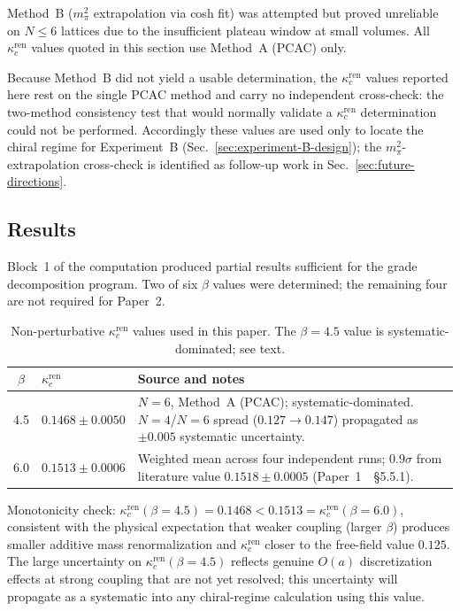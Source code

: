 \documentclass[12pt]{article}
\theoremstyle{definition}
\theoremstyle{remark}
\newcommand{\kcren}{\kappa_{c}^{\mathrm{ren}}}      %
\begin{document}
	Method~B ($m_\pi^2$ extrapolation via cosh fit) was attempted but proved
	unreliable on $N\leq6$ lattices due to the insufficient plateau window at
	small volumes.  All $\kcren$ values quoted in this section use Method~A
	(PCAC) only.
	
	Because Method~B did not yield a usable determination, the $\kcren$ values
	reported here rest on the single PCAC method and carry no independent
	cross-check: the two-method consistency test that would normally validate a
	$\kcren$ determination could not be performed.  Accordingly these values are
	used only to locate the chiral regime for Experiment~B
	(Sec.~\ref{sec:experiment-B-design}); the $m_\pi^2$-extrapolation cross-check
	is identified as follow-up work in Sec.~\ref{sec:future-directions}.
	
	\subsection{Results}
	\label{sec:kappa-c-results}
	
	Block~1 of the computation produced partial results sufficient for the grade
	decomposition program.  Two of six $\beta$ values were determined; the
	remaining four are not required for Paper~2.
	
	\begin{table}[ht]
		\centering
		\caption{Non-perturbative $\kcren$ values used in this paper.
			The $\beta=4.5$ value is systematic-dominated; see text.}
		\label{tab:kappa-c}
		\begin{tabular}{@{}clp{7.5cm}@{}}
			\toprule
			$\beta$ & $\kcren$ & Source and notes \\
			\midrule
			4.5 & $0.1468\pm0.0050$
			& $N=6$, Method~A (PCAC); systematic-dominated.
			$N=4$/$N=6$ spread ($0.127\to0.147$) propagated as
			$\pm0.005$ systematic uncertainty. \\[4pt]
			6.0 & $0.1513\pm0.0006$
			& Weighted mean across four independent runs;
			$0.9\sigma$ from literature value
			$0.1518\pm0.0005$
			(Paper~1~\cite{FirestoneP1}~\S5.5.1). \\
			\bottomrule
		\end{tabular}
	\end{table}
	
	Monotonicity check: $\kcren(\beta=4.5)=0.1468 < 0.1513=\kcren(\beta=6.0)$,
	consistent with the physical expectation that weaker coupling (larger $\beta$)
	produces smaller additive mass renormalization and $\kcren$ closer to the
	free-field value $0.125$.  The large uncertainty on $\kcren(\beta=4.5)$
	reflects genuine $O(a)$ discretization effects at strong coupling that are
	not yet resolved; this uncertainty will propagate as a systematic into any
	chiral-regime calculation using this value.
	
\end{document}
